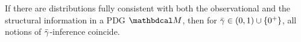 If there are distributions
fully
consistent with
both the observational and the structural information
in a PDG $\dg M$, 
then for ${\bar\gamma} \in (0,1) \cup \{0^+\}$, all
notions of ${\bar\gamma}$-inference 
coincide.
